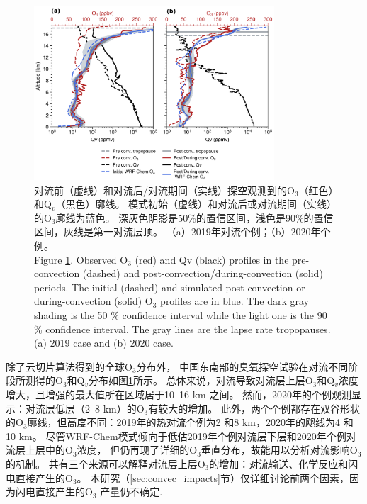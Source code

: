 \begin{figure}[!htbp]
\centering
\includegraphics[width=0.8\textwidth]{./figures/ozonesonde_profile.png}
\caption{对流前（虚线）和对流后/对流期间（实线）探空观测到的O$_3$（红色）和Q$_v$（黑色）廓线。
模式初始（虚线）和对流后或对流期间（实线）的O$_3$廓线为蓝色。
深灰色阴影是50\%的置信区间，浅色是90\%的置信区间，灰线是第一对流层顶。
（a）2019年对流个例；（b）2020年个例。\\
Figure \ref{fig:ozonesonde_profile}. Observed O$_3$ (red) and Qv (black) profiles in the pre-convection (dashed) and post-convection/during-convection (solid) periods.
The initial (dashed) and simulated post-convection or during-convection (solid) O$_3$ profiles are in blue.
The dark gray shading is the 50 \% confidence interval while the light one is the 90 \% confidence interval.
The gray lines are the lapse rate tropopauses.
(a) 2019 case and (b) 2020 case.
}
\label{fig:ozonesonde_profile}
\end{figure}

除了云切片算法得到的全球O$_3$分布外，
中国东南部的臭氧探空试验在对流不同阶段所测得的O$_3$和Q$_v$分布如图\ref{fig:ozonesonde_profile}所示。
总体来说，对流导致对流层上层O$_3$和Q$_v$浓度增大，且增强的最大值所在区域居于10--16 km 之间。
然而，2020年的个例观测显示：对流层低层（2--8 km）的O$_3$有较大的增加。
此外，两个个例都存在双谷形状的O$_3$廓线，但高度不同：2019年的热对流个例为2 和8 km，2020年的飑线为4 和10 km。
尽管WRF-Chem模式倾向于低估2019年个例对流层下层和2020年个例对流层上层中的O$_3$浓度，
但仍再现了详细的O$_3$垂直分布，故能用以分析对流影响O$_3$的机制。
共有三个来源可以解释对流层上层O$_3$的增加：对流输送、化学反应和闪电直接产生的O$_3$。
本研究（\ref{sec:convec_impacts}节）仅详细讨论前两个因素，因为闪电直接产生的O$_3$
产量仍不确定\citep{Morris.2010,Ripoll.2014}.



